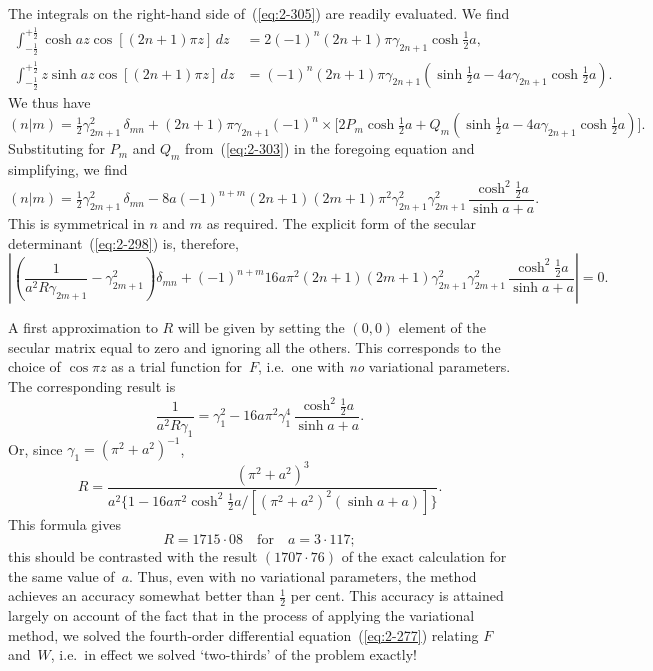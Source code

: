 The integrals on the right-hand side of~(\ref{eq:2-305}) are readily evaluated. We
find
\begin{equation}
\label{eq:2-306}
\begin{split}
\int_{-\frac{1}{2}}^{+\frac{1}{2}} \cosh az\cos[(2n+1)\pi z]\,dz &= 2(-1)^n(2n+1)\pi\gamma_{2n+1}\cosh\tfrac{1}{2}a,\\
\int_{-\frac{1}{2}}^{+\frac{1}{2}} z\sinh az\cos[(2n+1)\pi z]\,dz &= (-1)^n(2n+1)\pi\gamma_{2n+1}(\sinh\tfrac{1}{2}a - 4a\gamma_{2n+1}\cosh\tfrac{1}{2}a).
\end{split}
\end{equation}
We thus have
\begin{equation}
\label{eq:2-307}
(n|m) = \tfrac{1}{2}\gamma_{2m+1}^2\,\delta_{mn} + (2n+1)\pi\gamma_{2n+1}(-1)^n \times
\bigl[2P_m\cosh\tfrac{1}{2}a + Q_m(\sinh\tfrac{1}{2}a - 4a\gamma_{2n+1}\cosh\tfrac{1}{2}a)\bigr].
\end{equation}
Substituting for $P_m$ and $Q_m$ from~(\ref{eq:2-303}) in the foregoing equation and
simplifying, we find
\begin{equation}
\label{eq:2-308}
(n|m) = \tfrac{1}{2}\gamma_{2m+1}^2\,\delta_{mn} - 8a(-1)^{n+m}(2n+1)(2m+1)\pi^2\gamma_{2n+1}^2\gamma_{2m+1}^2\,\frac{\cosh^2\!\tfrac{1}{2}a}{\sinh a + a}.
\end{equation}
This is symmetrical in $n$ and $m$ as required.
The explicit form of the secular determinant~(\ref{eq:2-298}) is, therefore,
\begin{equation}
\label{eq:2-309}
\left|\left(\frac{1}{a^2 R\gamma_{2m+1}} - \gamma_{2m+1}^2\right)\delta_{mn} +
(-1)^{n+m} 16a\pi^2 (2n+1)(2m+1)\gamma_{2n+1}^2\gamma_{2m+1}^2\,\frac{\cosh^2\!\tfrac{1}{2}a}{\sinh a + a}\right| = 0.
\end{equation}

A first approximation to $R$ will be given by setting the $(0,0)$ element
of the secular matrix equal to zero and ignoring all the others. This
corresponds to the choice of $\cos\pi z$ as a trial function for~$F$, i.e.\ one
with \emph{no} variational parameters. The corresponding result is
\begin{equation}
\label{eq:2-310}
\frac{1}{a^2 R\gamma_1} = \gamma_1^2 - 16a\pi^2\gamma_1^4\,\frac{\cosh^2\!\tfrac{1}{2}a}{\sinh a + a}.
\end{equation}
Or, since $\gamma_1 = (\pi^2 + a^2)^{-1}$,
\begin{equation}
\label{eq:2-311}
R = \frac{(\pi^2 + a^2)^3}{a^2\{1 - 16a\pi^2\cosh^2\!\tfrac{1}{2}a/[(\pi^2+a^2)^2(\sinh a+a)]\}}.
\end{equation}
This formula gives
\begin{equation}
\label{eq:2-312}
R = 1715{\cdot}08 \quad\text{for}\quad a = 3{\cdot}117;
\end{equation}
this should be contrasted with the result $(1707{\cdot}76)$ of the exact calculation
for the same value of~$a$. Thus, even with no variational parameters,
the method achieves an accuracy somewhat better than $\tfrac{1}{2}$ per cent.
This accuracy is attained largely on account of the fact that in the
process of applying the variational method, we solved the fourth-order
differential equation~(\ref{eq:2-277}) relating $F$ and~$W$, i.e.\ in effect we solved
`two-thirds' of the problem exactly!

